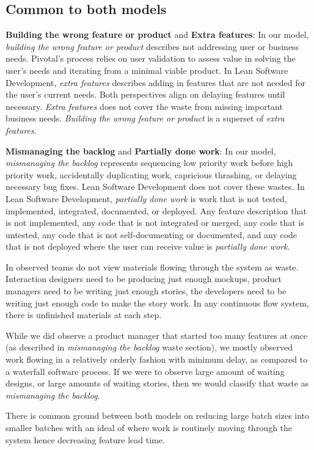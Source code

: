\subsection{Common to both models}
\textbf{Building the wrong feature or product} and \textbf{Extra features}: In our model, \textit{building the wrong feature or product} describes not addressing user or business needs. Pivotal's process relies on user validation to assess value in solving the user's needs and iterating from a minimal viable product. In Lean Software Development, \textit{extra features} describes adding in features that are not needed for the user's current needs. Both perspectives align on delaying features until necessary. \textit{Extra features} does not cover the waste from missing important business needs. \textit{Building the wrong feature or product} is a superset of \textit{extra features}.

\textbf{Mismanaging the backlog} and \textbf{Partially done work}: In our model, \textit{mismanaging the backlog} represents sequencing low priority work before high priority work, accidentally duplicating work, capricious thrashing, or delaying necessary bug fixes. Lean Software Development does not cover these wastes. In Lean Software Development, \textit{partially done work} is work that is not tested, implemented, integrated, documented, or deployed. Any feature description that is not implemented, any code that is not integrated or merged, any code that is untested, any code that is not self-documenting or documented, and any code that is not deployed where the user can receive value is \textit{partially done work}.

In observed teams do not view materials flowing through the system as waste. Interaction designers need to be producing just enough mockups, product managers need to be writing just enough stories, the developers need to be writing just enough code to make the story work. In any continuous flow system, there is unfinished materials at each step. 

While we did observe a product manager that started too many features at once (as described in \textit{mismanaging the backlog} waste section), we mostly observed work flowing in a relatively orderly fashion with minimum delay, as compared to a waterfall software process. If we were to observe large amount of waiting designs, or large amounts of waiting stories, then we would classify that waste as \textit{mismanaging the backlog}.

There is common ground between both models on reducing large batch sizes into smaller batches with an ideal of   where work is routinely moving through the system hence decreasing feature lead time. 

